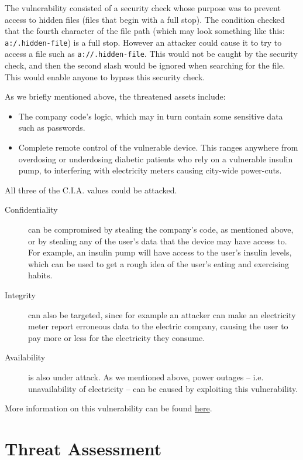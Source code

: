 \documentclass{article}
\begin{document}
The vulnerability consisted of a security check whose purpose was to prevent access to hidden files (files that begin with a full stop). The condition checked that the fourth character of the file path (which may look something like this: \verb|a:/.hidden-file|) is a full stop. However an attacker could cause it to try to access a file such as \verb|a://.hidden-file|. This would not be caught by the security check, and then the second slash would be ignored when searching for the file. This would enable anyone to bypass this security check.

As we briefly mentioned above, the threatened assets include:
\begin{itemize}
	\item The company code's logic, which may in turn contain some sensitive data such as passwords.
	\item Complete remote control of the vulnerable device. This ranges anywhere from overdosing or underdosing diabetic patients who rely on a vulnerable insulin pump, to interfering with electricity meters causing city-wide power-cuts.
\end{itemize}

All three of the C.I.A. values could be attacked.
\begin{description}
	\item[Confidentiality] can be compromised by stealing the company's code, as mentioned above, or by stealing any of the user's data that the device may have access to. For example, an insulin pump will have access to the user's insulin levels, which can be used to get a rough idea of the user's eating and exercising habits.
	\item[Integrity] can also be targeted, since for example an attacker can make an electricity meter report erroneous data to the electric company, causing the user to pay more or less for the electricity they consume.
	\item[Availability] is also under attack. As we mentioned above, power outages -- i.e. unavailability of electricity -- can be caused by exploiting this vulnerability.
\end{description}

More information on this vulnerability can be found \href{https://securityintelligence.com/posts/new-vulnerability-could-put-iot-devices-at-risk/}{here}.

\section{Threat Assessment}
\end{document}
